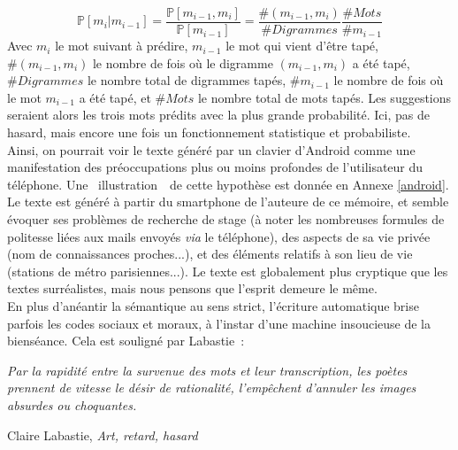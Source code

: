 \documentclass{article}
\newenvironment{citationbox}
{\begin{center}
		\begin{minipage}{.8\textwidth}
		}
		{
		\end{minipage}	
\end{center}
}
\begin{document}
				\begin{equation}
					\mathbb{P}[m_i | m_{i-1}] = \frac{\mathbb{P}[m_{i-1}, m_i]}{\mathbb{P}[m_{i-1}]} = \frac{\#(m_{i-1}, m_i)}{\#Digrammes}\frac{\#Mots}{\#m_{i-1}}
				\end{equation} 
				Avec $m_i$ le mot suivant à prédire, $m_{i-1}$ le mot qui vient d'être tapé, $\#(m_{i-1}, m_i)$ le nombre de fois où le digramme $(m_{i-1}, m_i)$ a été tapé, $\#Digrammes$ le nombre total de digrammes tapés, $\#m_{i-1}$ le nombre de fois où le mot $m_{i-1}$ a été tapé, et $\#Mots$ le nombre total de mots tapés. Les suggestions seraient alors les trois mots prédits avec la plus grande probabilité. Ici, pas de hasard, mais encore une fois un fonctionnement statistique et probabiliste.\\
				
				Ainsi, on pourrait voir le texte généré par un clavier d'Android comme une manifestation des préoccupations plus ou moins profondes de l'utilisateur du téléphone. Une \guillemotleft~illustration~\guillemotright~de cette hypothèse est donnée en Annexe \ref{android}. Le texte est généré à partir du smartphone de l'auteure de ce mémoire, et semble évoquer ses problèmes de recherche de stage (à noter les nombreuses formules de politesse liées aux mails envoyés \textit{via} le téléphone), des aspects de sa vie privée (nom de connaissances proches...), et des éléments relatifs à son lieu de vie (stations de métro parisiennes...). Le texte est globalement plus cryptique que les textes surréalistes, mais nous pensons que l'esprit demeure le même.\\
				
				En plus d'anéantir la sémantique au sens strict, l'écriture automatique brise parfois les codes sociaux et moraux, à l'instar d'une machine insoucieuse de la bienséance. Cela est souligné par Labastie~:
				\begin{citationbox}
					\textit{Par la rapidité entre la survenue des mots et leur transcription, les poètes prennent de vitesse le désir de rationalité, l'empêchent d'annuler les images absurdes ou choquantes.}
					\begin{flushright}
						Claire Labastie, \textit{Art, retard, hasard}\autocite{labastie2016}
					\end{flushright}
				\end{citationbox}
				
\end{document}
